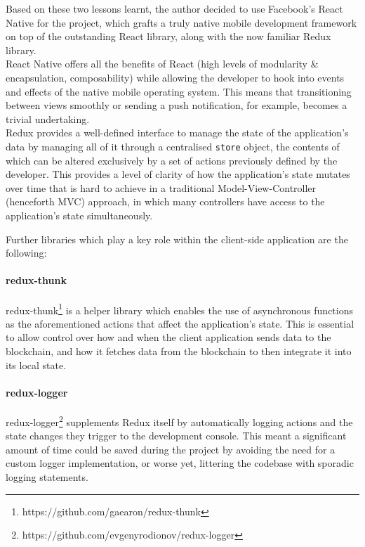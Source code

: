 Based on these two lessons learnt, the author decided to use Facebook's
React Native\cite{2react-native} for the project, which grafts a truly native mobile development
framework on top of the outstanding React library, along with the now
familiar Redux library.\\
React Native offers all the benefits of React (high levels of modularity
\& encapsulation, composability) while allowing the developer to hook
into events and effects of the native mobile operating system. This
means that transitioning between views smoothly or sending a push
notification, for example, becomes a trivial undertaking.\\
Redux provides a well-defined interface to manage the state of the
application's data by managing all of it through a centralised
\texttt{store} object, the contents of which can be altered exclusively
by a set of actions previously defined by the developer. This provides a
level of clarity of how the application's state mutates over time that
is hard to achieve in a traditional Model-View-Controller\cite{krasner1988description}
(henceforth MVC) approach, in which many controllers have access to the
application's state simultaneously.

Further libraries which play a key role within the client-side
application are the following:

\paragraph{redux-thunk}\label{redux-thunk}

redux-thunk\footnote{https://github.com/gaearon/redux-thunk}
is a helper library which enables the use of asynchronous functions as
the aforementioned actions that affect the application's state. This is
essential to allow control over how and when the client application
sends data to the blockchain, and how it fetches data from the
blockchain to then integrate it into its local state.

\paragraph{redux-logger}\label{redux-logger}

redux-logger\footnote{https://github.com/evgenyrodionov/redux-logger}
supplements Redux itself by automatically logging actions and the state
changes they trigger to the development console. This meant a
significant amount of time could be saved during the project by avoiding
the need for a custom logger implementation, or worse yet, littering the
codebase with sporadic logging statements.

